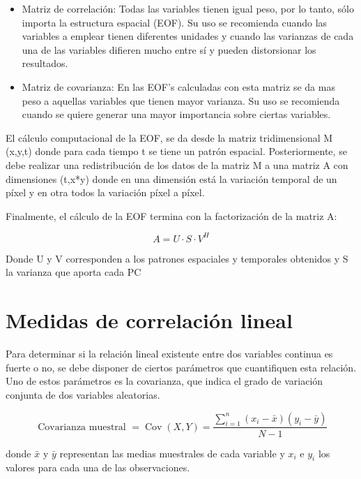 \begin{itemize}
	\item Matriz de correlación: Todas las variables tienen igual peso, por lo tanto, sólo importa la estructura espacial (EOF). Su uso se recomienda cuando las variables a emplear tienen diferentes unidades y cuando las varianzas de cada una de las variables difieren mucho entre sí y pueden distorsionar los resultados.
	\item Matriz de covarianza: En las EOF's calculadas con esta matriz se da mas peso a aquellas variables que tienen mayor varianza. Su uso se recomienda cuando se quiere generar una mayor importancia sobre ciertas variables.
\end{itemize}

El cálculo computacional de la EOF, se da desde la matriz tridimensional M (x,y,t) donde para cada tiempo t se tiene un patrón espacial. Posteriormente, se debe realizar una redistribución de los datos de la matriz M a una matriz A con dimensiones (t,x*y) donde en una dimensión está la variación temporal de un píxel y en otra todos la variación píxel a píxel.  

Finalmente, el cálculo de la EOF termina con la factorización de la matriz A:

\begin{equation}
A  = U \cdot S \cdot V^H
\end{equation}

Donde U y V corresponden a los patrones espaciales y temporales obtenidos y S la varianza que aporta cada PC

\section{Medidas de correlación lineal}

Para determinar si la relación lineal existente entre dos variables continua es fuerte o no, se debe disponer de ciertos parámetros que cuantifiquen esta relación. Uno de estos parámetros es la covarianza, que indica el grado de variación conjunta de dos variables aleatorias.

\begin{equation}
\text { Covarianza muestral }=\operatorname{Cov}(X, Y)=\frac{\sum_{i=1}^{n}\left(x_{i}-\bar{x}\right)\left(y_{i}-\bar{y}\right)}{N-1}
\end{equation}

donde $\bar{x}$ y $\bar{y}$ representan las medias muestrales de cada variable y $x_{i}$ e $y_{i}$ los valores para cada una de las observaciones.

